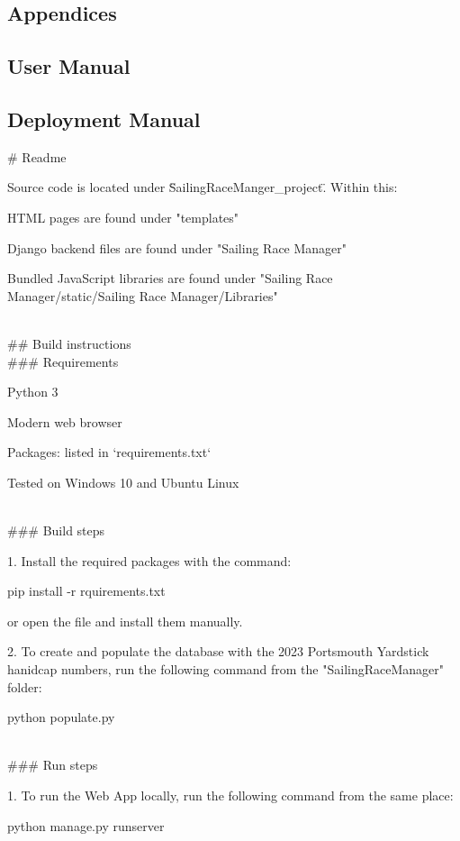 \documentclass{l4proj}
\begin{document}
\begin{appendices}

\chapter{Appendices}

\section{User Manual}


\section{Deployment Manual}
\# Readme

Source code is located under \"SailingRaceManger_project\". Within this:

HTML pages are found under "templates"

Django backend files are found under "Sailing Race Manager"

Bundled JavaScript libraries are found under "Sailing Race Manager/static/Sailing Race Manager/Libraries"

\hfill\\
\#\# Build instructions
\hfill\\
\#\#\# Requirements

Python 3

Modern web browser

Packages: listed in `requirements.txt` 

Tested on Windows 10 and Ubuntu Linux

\hfill\\
\#\#\# Build steps

1. Install the required packages with the command:

	pip install -r rquirements.txt

or open the file and install them manually.

2. To create and populate the database with the 2023 Portsmouth Yardstick hanidcap numbers, run the following command from the "SailingRaceManager" folder:

	python populate.py

\hfill\\
\#\#\# Run steps

1. To run the Web App locally, run the following command from the same place:

	python manage.py runserver


\end{appendices}
\end{document}
